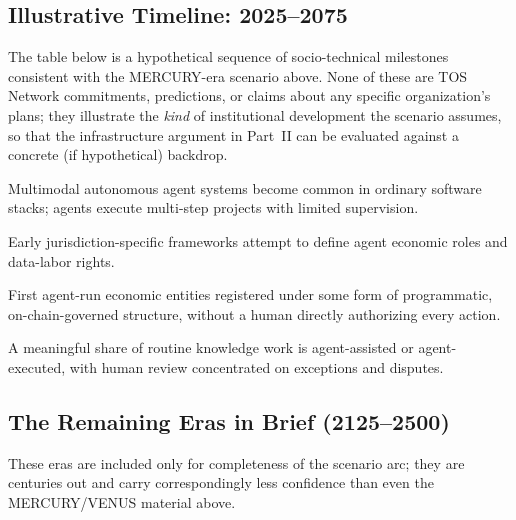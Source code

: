 \documentclass[11pt,oneside]{article}
\begin{document}
\subsection{Illustrative Timeline: 2025--2075}

The table below is a hypothetical sequence of socio-technical milestones consistent with the
MERCURY-era scenario above. None of these are TOS Network commitments, predictions, or
claims about any specific organization's plans; they illustrate the \emph{kind} of
institutional development the scenario assumes, so that the infrastructure argument in
Part~II can be evaluated against a concrete (if hypothetical) backdrop.

\begin{description}[style=nextline,leftmargin=2cm]
  \item[Illustrative, +1--10y] Multimodal autonomous agent systems become common in ordinary
  software stacks; agents execute multi-step projects with limited supervision.
  \item[Illustrative, +3--8y] Early jurisdiction-specific frameworks attempt to define agent
  economic roles and data-labor rights.
  \item[Illustrative, +5--12y] First agent-run economic entities registered under some form of
  programmatic, on-chain-governed structure, without a human directly authorizing every
  action.
  \item[Illustrative, +10--20y] A meaningful share of routine knowledge work is agent-assisted
  or agent-executed, with human review concentrated on exceptions and disputes.
\end{description}

\subsection{The Remaining Eras in Brief (2125--2500)}

These eras are included only for completeness of the scenario arc; they are centuries out and
carry correspondingly less confidence than even the MERCURY/VENUS material above.
\end{document}
